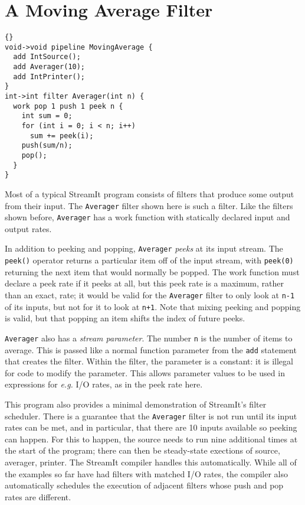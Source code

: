 \section{A Moving Average Filter}

\begin{lstlisting}{}
void->void pipeline MovingAverage {
  add IntSource();
  add Averager(10);
  add IntPrinter();
}
int->int filter Averager(int n) {
  work pop 1 push 1 peek n {
    int sum = 0;
    for (int i = 0; i < n; i++)
      sum += peek(i);
    push(sum/n);
    pop();
  }
}
\end{lstlisting}

Most of a typical StreamIt program consists of filters that produce
some output from their input.  The \lstinline|Averager| filter shown
here is such a filter.  Like the filters shown before,
\lstinline|Averager| has a work function with statically declared
input and output rates.

In addition to peeking and popping, \lstinline|Averager| \emph{peeks}
at its input stream.  The \lstinline|peek()| operator returns a
particular item off of the input stream, with \lstinline|peek(0)|
returning the next item that would normally be popped.  The work
function must declare a peek rate if it peeks at all, but this peek
rate is a maximum, rather than an exact, rate; it would be valid for
the \lstinline|Averager| filter to only look at \lstinline|n-1| of its
inputs, but not for it to look at \lstinline|n+1|.  Note that mixing
peeking and popping is valid, but that popping an item shifts the
index of future peeks.

\lstinline|Averager| also has a \emph{stream parameter}.  The number
\lstinline|n| is the number of items to average.  This is passed like
a normal function parameter from the \lstinline|add| statement that
creates the filter.  Within the filter, the parameter is a constant:
it is illegal for code to modify the parameter.  This allows parameter
values to be used in expressions for \emph{e.g.} I/O rates, as in the
peek rate here.

This program also provides a minimal demonstration of StreamIt's
filter scheduler.  There is a guarantee that the \lstinline|Averager|
filter is not run until its input rates can be met, and in particular,
that there are 10 inputs available so peeking can happen.  For this to
happen, the source needs to run nine additional times at the start of
the program; there can then be steady-state exections of source,
averager, printer.  The StreamIt compiler handles this automatically.
While all of the examples so far have had filters with matched I/O
rates, the compiler also automatically schedules the execution of
adjacent filters whose push and pop rates are different.

